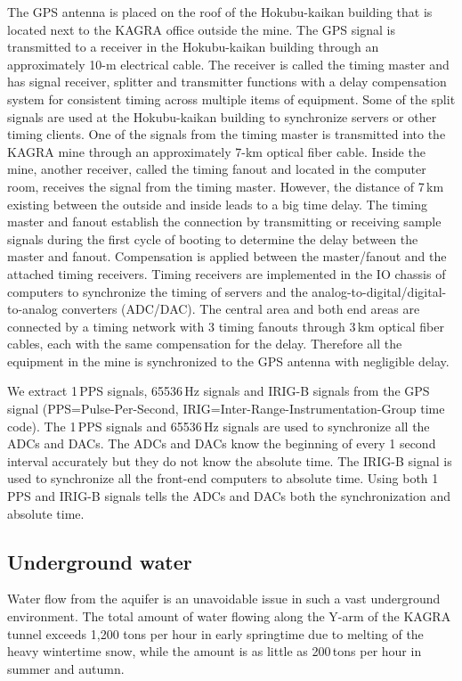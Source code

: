 \documentclass[prd ,twocolumn ,secnumarabic,dvips
,amssymb, amsmath,nobibnotes, aps, prd,superscriptaddress]{revtex4-1}
\begin{document}
{The GPS antenna is placed on the roof of the Hokubu-kaikan building that is 
located next to the KAGRA office outside the mine. The GPS signal is transmitted to a receiver in the Hokubu-kaikan building through an approximately 10-m electrical cable. The receiver is called the timing master and has signal receiver, splitter and transmitter functions with a delay compensation system for consistent timing across multiple items of equipment. Some of the split signals are used at the Hokubu-kaikan building to synchronize servers or other timing clients. One of the signals from the timing master is transmitted into the KAGRA mine through an approximately 7-km optical fiber cable. Inside the mine, another receiver, called the timing fanout and located in the computer room, receives the signal from the timing master. 
However, the distance of 7\,km existing between the outside and inside leads to a big time delay. The timing master and fanout establish the connection by transmitting or receiving sample signals during the first cycle of booting to determine the delay between the master and fanout. Compensation is applied between the master/fanout and the attached timing receivers. Timing receivers are implemented in the IO chassis of computers to synchronize the timing of servers and the analog-to-digital/digital-to-analog converters (ADC/DAC). The central area and both end areas are connected by a timing network with 3 timing fanouts through 3\,km optical fiber cables, each with the same compensation for the delay. Therefore all the equipment in the mine is synchronized to the GPS antenna with negligible delay.

We extract 1\,PPS signals, 65536\,Hz signals and IRIG-B signals from the GPS signal (PPS=Pulse-Per-Second, IRIG=Inter-Range-Instrumentation-Group time code). The 1\,PPS signals and 65536\,Hz signals are used to synchronize all the ADCs and DACs. The ADCs and DACs know the beginning of every 1 second interval accurately but they do not know the absolute time. The IRIG-B signal is used to synchronize all the front-end computers to absolute time. Using both 1\,PPS and IRIG-B signals tells the ADCs and DACs both the synchronization and absolute time.

\subsection{Underground water}\label{sec:water}
%

Water flow from the aquifer is an unavoidable issue in such a vast underground environment. 
The total amount of water flowing along the Y-arm of the KAGRA
tunnel exceeds 1,200 tons per hour in early springtime due
to melting of the heavy wintertime snow, while the amount is as little as 200\,tons per hour in summer and autumn.

}
\end{document}
